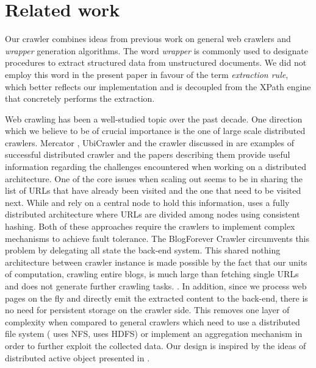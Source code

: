 \section{Related work}
\label{relatedwork}

Our crawler combines ideas from previous work on general web crawlers and \emph{wrapper} generation algorithms. The word \emph{wrapper} is commonly used to designate procedures to extract structured data from unstructured documents. We did not employ this word in the present paper in favour of the term \emph{extraction rule}, which better reflects our implementation and is decoupled from the XPath engine that concretely performs the extraction.

Web crawling has been a well-studied topic over the past decade. One direction which we believe to be of crucial importance is the one of large scale distributed crawlers. Mercator \cite{heydon99mercator}, UbiCrawler \cite{boldi2003} and the crawler discussed in \cite{shkapenyuk2002} are examples of successful distributed crawler and the papers describing them provide useful information regarding the challenges encountered when working on a distributed architecture. One of the core issues when scaling out seems to be in sharing the list of URLs that have already been visited and the one that need to be visited next. While \cite{heydon99mercator} and \cite{shkapenyuk2002} rely on a central node to hold this information, \cite{boldi2003} uses a fully distributed architecture where URLs are divided among nodes using consistent hashing. Both of these approaches require the crawlers to implement complex mechanisms to achieve fault tolerance. The BlogForever Crawler circumvents this problem by delegating all state  the back-end system. This shared nothing architecture between crawler instance is made possible by the fact that our units of computation, crawling entire blogs, is much large than fetching single URLs and does not generate further crawling tasks. . In addition, since we process web pages on the fly and directly emit the extracted content to the back-end, there is no need for persistent storage on the crawler side. This removes one layer of complexity when compared to general crawlers which need to use a distributed file system (\cite{shkapenyuk2002} uses NFS, \cite{berger2011} uses HDFS) or implement an aggregation mechanism in order to further exploit the collected data. Our design is inspired by the ideas of distributed active object presented in \cite{activeobject1996}.

